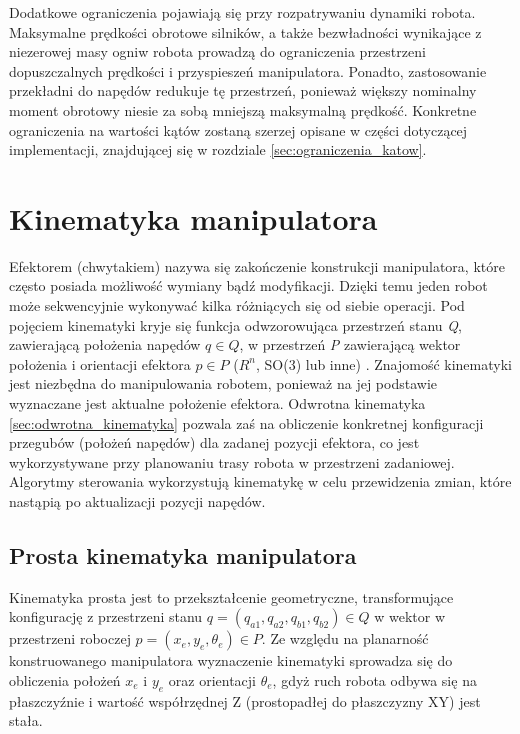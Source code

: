\documentclass[printmode]{mgr}
\begin{document}
Dodatkowe ograniczenia pojawiają się przy rozpatrywaniu dynamiki robota. Maksymalne prędkości obrotowe silników, a także
bezwładności wynikające z niezerowej masy ogniw robota prowadzą do ograniczenia przestrzeni dopuszczalnych prędkości i przyspieszeń manipulatora.
Ponadto, zastosowanie przekładni do napędów redukuje tę przestrzeń, ponieważ większy nominalny moment obrotowy niesie za sobą
mniejszą maksymalną prędkość. Konkretne ograniczenia na wartości kątów zostaną szerzej opisane w części dotyczącej implementacji, 
znajdującej się w rozdziale \ref{sec:ograniczenia_katow}. 


\section{Kinematyka manipulatora}\label{sec:kinematyka_manipulatora}
Efektorem (chwytakiem) nazywa się zakończenie konstrukcji manipulatora, które często posiada możliwość wymiany bądź modyfikacji. 
Dzięki temu jeden robot może sekwencyjnie wykonywać kilka różniących się od siebie operacji. Pod pojęciem kinematyki kryje się
funkcja odwzorowująca przestrzeń stanu \emph{Q}, zawierającą położenia napędów $q \in Q$,
w przestrzeń \emph{P} zawierającą wektor położenia i orientacji efektora $p \in P$ ($R^n$, SO(3) lub inne) \cite{podstawy_robotyki}.
Znajomość kinematyki jest niezbędna do manipulowania robotem, ponieważ na jej podstawie wyznaczane jest
aktualne położenie efektora. Odwrotna kinematyka \ref{sec:odwrotna_kinematyka} pozwala zaś na obliczenie konkretnej
konfiguracji przegubów (położeń napędów) dla zadanej pozycji efektora, co jest wykorzystywane przy planowaniu trasy robota w
przestrzeni zadaniowej. Algorytmy sterowania wykorzystują kinematykę w celu przewidzenia zmian, które nastąpią po aktualizacji pozycji napędów.

\subsection{Prosta kinematyka manipulatora}\label{sec:prosta_kinematyka}
Kinematyka prosta jest to przekształcenie geometryczne, transformujące konfigurację z przestrzeni stanu 
$q = (q_{a1}, q_{a2}, q_{b1}, q_{b2}) \in Q$ w wektor w przestrzeni
roboczej $p = (x_e, y_e, \theta_e) \in P$.
Ze względu na planarność konstruowanego manipulatora wyznaczenie kinematyki sprowadza się do obliczenia położeń $x_e$ i $y_e$ oraz
orientacji $\theta_e$, gdyż
ruch robota odbywa się na płaszczyźnie i wartość współrzędnej Z (prostopadłej do płaszczyzny XY) jest stała.
\end{document}

